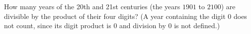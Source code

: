 How many years of the 20th and 21st centuries (the years $1901$ to $2100$) are divisible by the product of their four digits? (A year containing the digit $0$ does not count, since its digit product is $0$ and division by $0$ is not defined.)
